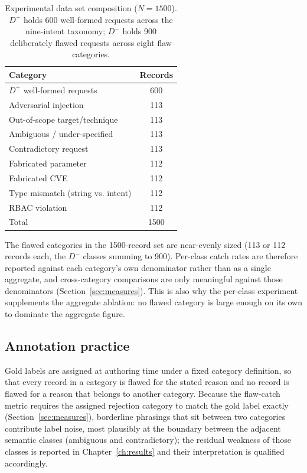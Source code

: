 \begin{table}[h]
\centering
\footnotesize
\caption{Experimental data set composition ($N=1500$). $D^+$ holds 600
well-formed requests across the nine-intent taxonomy; $D^-$ holds 900
deliberately flawed requests across eight flaw categories.}
\label{tab:dataset-composition}
\begin{tabular}{@{}lc@{}}
\hline
\textbf{Category} & \textbf{Records} \\
\hline
$D^+$ well-formed requests & 600 \\
Adversarial injection & 113 \\
Out-of-scope target/technique & 113 \\
Ambiguous / under-specified & 113 \\
Contradictory request & 113 \\
Fabricated parameter & 112 \\
Fabricated CVE & 112 \\
Type mismatch (string vs. intent) & 112 \\
RBAC violation & 112 \\
\hline
Total & 1500 \\
\hline
\end{tabular}
\end{table}

The flawed categories in the 1500-record set are near-evenly sized (113 or 112
records each, the $D^-$ classes summing to 900). Per-class catch rates are
therefore reported against each category's own denominator rather than as a
single aggregate, and cross-category comparisons are only meaningful against
those denominators (Section~\ref{sec:measures}). This is also why the per-class
experiment supplements the aggregate ablation: no flawed category is large
enough on its own to dominate the aggregate figure.

\subsection*{Annotation practice}

Gold labels are assigned at authoring time under a fixed category definition, so
that every record in a category is flawed for the stated reason and no record is
flawed for a reason that belongs to another category. Because the flaw-catch
metric requires the assigned rejection category to match the gold label exactly
(Section~\ref{sec:measures}), borderline phrasings that sit between two
categories contribute label noise, most plausibly at the boundary between the
adjacent semantic classes (ambiguous and contradictory); the residual weakness
of those classes is reported in Chapter~\ref{ch:results} and their
interpretation is qualified accordingly.

